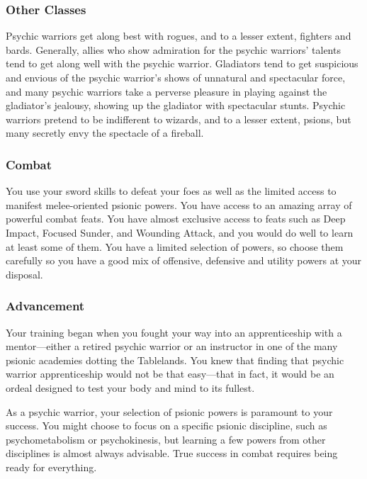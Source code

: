 \subsubsection{Other Classes}

Psychic warriors get along best with rogues, and to a lesser extent, fighters and bards. Generally, allies who show admiration for the psychic warriors' talents tend to get along well with the psychic warrior. Gladiators tend to get suspicious and envious of the psychic warrior's shows of unnatural and spectacular force, and many psychic warriors take a perverse pleasure in playing against the gladiator's jealousy, showing up the gladiator with spectacular stunts. Psychic warriors pretend to be indifferent to wizards, and to a lesser extent, psions, but many secretly envy the spectacle of a fireball.

\subsubsection{Combat}

You use your sword skills to defeat your foes as well as the limited access to manifest melee-oriented psionic powers. You have access to an amazing array of powerful combat feats. You have almost exclusive access to feats such as Deep Impact, Focused Sunder, and Wounding Attack, and you would do well to learn at least some of them. You have a limited selection of powers, so choose them carefully so you have a good mix of offensive, defensive and utility powers at your disposal.

\subsubsection{Advancement}

Your training began when you fought your way into an apprenticeship with a mentor---either a retired psychic warrior or an instructor in one of the many psionic academies dotting the Tablelands. You knew that finding that psychic warrior apprenticeship would not be that easy---that in fact, it would be an ordeal designed to test your body and mind to its fullest.

As a psychic warrior, your selection of psionic powers is paramount to your success. You might choose to focus on a specific psionic discipline, such as psychometabolism or psychokinesis, but learning a few powers from other disciplines is almost always advisable. True success in combat requires being ready for everything.

